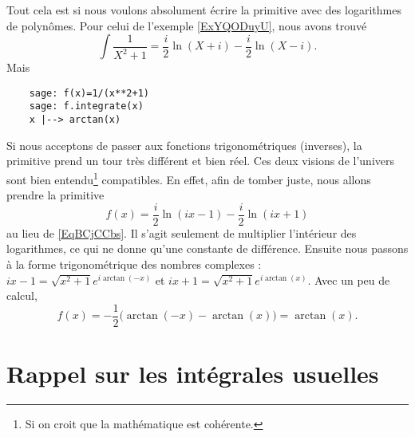 \begin{remark}
    Tout cela est si nous voulons absolument écrire la primitive avec des logarithmes de polynômes. Pour celui de l'exemple \ref{ExYQODuyU}, nous avons trouvé
    \begin{equation}    \label{EqBCjCCbs}
        \int\frac{1}{ X^2+1 }=\frac{ i }{2}\ln(X+i)-\frac{ i }{2}\ln(X-i).
    \end{equation}
    Mais
    \begin{verbatim}
    sage: f(x)=1/(x**2+1)                                                                                                                      
    sage: f.integrate(x)
    x |--> arctan(x)
    \end{verbatim}
    Si nous acceptons de passer aux fonctions trigonométriques (inverses), la primitive prend un tour très différent et bien réel. Ces deux visions de l'univers sont bien entendu\footnote{Si on croit que la mathématique est cohérente.} compatibles. En effet, afin de tomber juste, nous allons prendre la primitive
    \begin{equation}
        f(x)=\frac{ i }{2}\ln(ix-1)-\frac{ i }{2}\ln(ix+1)
    \end{equation}
    au lieu de \eqref{EqBCjCCbs}. Il s'agit seulement de multiplier l'intérieur des logarithmes, ce qui ne donne qu'une constante de différence. Ensuite nous passons à la forme trigonométrique des nombres complexes : \( ix-1=\sqrt{x^2+1} e^{i\arctan(-x)}\) et \( ix+1=\sqrt{x^2+1} e^{i\arctan(x)}\). Avec un peu de calcul,
    \begin{equation}
        f(x)=-\frac{ 1 }{2}\Big( \arctan(-x)-\arctan(x) \Big)=\arctan(x).
    \end{equation}
\end{remark}


\section{Rappel sur les intégrales usuelles}


